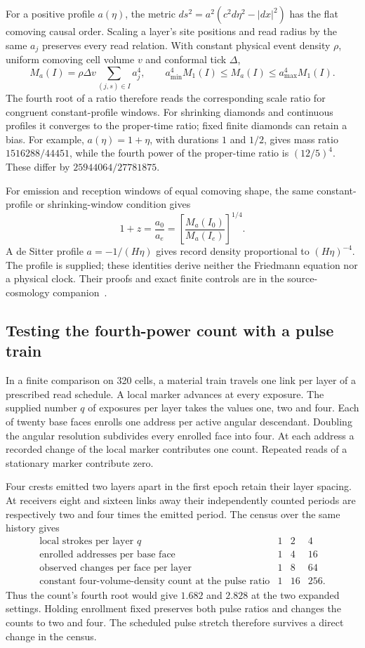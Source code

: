 \documentclass[11pt]{article}
\theoremstyle{remark}
\theoremstyle{plain}
\begin{document}
For a positive profile \(a(\eta)\), the metric
\(ds^2=a^2(c^2d\eta^2-|dx|^2)\) has the flat comoving causal order.
Scaling a layer's site positions and read radius by the same \(a_j\)
preserves every read relation. With constant physical event density \(\rho\),
uniform comoving cell volume \(v\) and conformal tick \(\Delta\),
\[
 M_a(I)=\rho\Delta v\sum_{(j,s)\in I}a_j^4,
 \qquad a_{\min}^4M_1(I)\le M_a(I)\le a_{\max}^4M_1(I).
\]
The fourth root of a ratio therefore reads the corresponding scale ratio
for congruent constant-profile windows. For shrinking diamonds and continuous
profiles it converges to the proper-time ratio; fixed finite diamonds can
retain a bias. For example, \(a(\eta)=1+\eta\), with durations \(1\)
and \(1/2\), gives mass ratio \(1516288/44451\), while the fourth power
of the proper-time ratio is \((12/5)^4\). These differ by
\(25944064/27781875\).

For emission and reception windows of equal comoving shape, the same
constant-profile or shrinking-window condition gives
\[
 1+z=\frac{a_0}{a_e}=\left[\frac{M_a(I_0)}{M_a(I_e)}\right]^{1/4}.
\] A de Sitter profile
\(a=-1/(H\eta)\) gives record density proportional to \((H\eta)^{-4}\).
The profile is supplied; these identities derive neither the Friedmann
equation nor a physical clock. Their proofs and exact finite controls are
in the source-cosmology companion~\cite{ophcmb}.

\subsection{Testing the fourth-power count with a pulse train}

In a finite comparison on 320 cells, a material train travels one link
per layer of a prescribed read schedule. A local marker advances at every
exposure. The supplied number \(q\) of exposures per layer takes the values
one, two and four. Each of twenty base faces enrolls one address per
active angular descendant. Doubling the angular resolution subdivides
every enrolled face into four. At each address a recorded change of the
local marker contributes one count. Repeated reads of a stationary
marker contribute zero.

Four crests emitted two layers apart in the first epoch retain their
layer spacing. At receivers eight and sixteen links away their independently
counted periods are respectively two and four times the emitted period.
The census over the same history gives
\[
\begin{array}{c|ccc}
\text{local strokes per layer }q & 1 & 2 & 4\\
\text{enrolled addresses per base face} & 1 & 4 & 16\\
\text{observed changes per face per layer} & 1 & 8 & 64\\
\text{constant four-volume-density count at the pulse ratio} & 1 &16 &256 .
\end{array}
\]
Thus the count's fourth root would give \(1.682\) and \(2.828\) at the
two expanded settings. Holding enrollment fixed preserves both pulse
ratios and changes the counts to two and four. The scheduled pulse
stretch therefore survives a direct change in the census.
\end{document}
